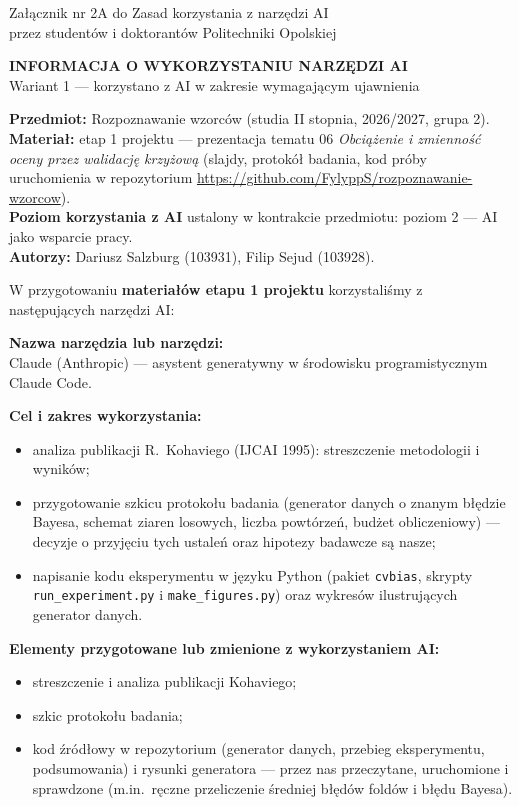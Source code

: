 \documentclass[11pt,a4paper]{article}
\begin{document}
\begin{flushright}\small
Załącznik nr 2A do Zasad korzystania z narzędzi AI\\
przez studentów i doktorantów Politechniki Opolskiej
\end{flushright}

\begin{center}
{\large\bfseries INFORMACJA O WYKORZYSTANIU NARZĘDZI AI}\\[0.4em]
Wariant 1 --- korzystano z AI w zakresie wymagającym ujawnienia
\end{center}

\textbf{Przedmiot:} Rozpoznawanie wzorców (studia II stopnia, 2026/2027, grupa 2).\\
\textbf{Materiał:} etap 1 projektu --- prezentacja tematu 06 \emph{Obciążenie i zmienność oceny przez
walidację krzyżową} (slajdy, protokół badania, kod próby uruchomienia w repozytorium
\url{https://github.com/FylyppS/rozpoznawanie-wzorcow}).\\
\textbf{Poziom korzystania z AI} ustalony w kontrakcie przedmiotu: poziom 2 --- AI jako wsparcie pracy.\\
\textbf{Autorzy:} Dariusz Salzburg (103931), Filip Sejud (103928).

\medskip
W przygotowaniu \textbf{materiałów etapu 1 projektu}
korzystaliśmy z następujących narzędzi AI:

\textbf{Nazwa narzędzia lub narzędzi:}\\
Claude (Anthropic) --- asystent generatywny w środowisku programistycznym Claude Code.

\textbf{Cel i zakres wykorzystania:}
\begin{itemize}
  \item analiza publikacji R.~Kohaviego (IJCAI 1995): streszczenie metodologii i wyników;
  \item przygotowanie szkicu protokołu badania (generator danych o znanym błędzie Bayesa, schemat
    ziaren losowych, liczba powtórzeń, budżet obliczeniowy) --- decyzje o przyjęciu tych ustaleń
    oraz hipotezy badawcze są nasze;
  \item napisanie kodu eksperymentu w języku Python (pakiet \texttt{cvbias}, skrypty
    \texttt{run\_experiment.py} i \texttt{make\_figures.py}) oraz wykresów ilustrujących generator danych.
\end{itemize}

\textbf{Elementy przygotowane lub zmienione z wykorzystaniem AI:}
\begin{itemize}
  \item streszczenie i analiza publikacji Kohaviego;
  \item szkic protokołu badania;
  \item kod źródłowy w repozytorium (generator danych, przebieg eksperymentu, podsumowania) i rysunki
    generatora --- przez nas przeczytane, uruchomione i sprawdzone (m.in.\ ręczne przeliczenie średniej
    błędów foldów i błędu Bayesa).
\end{itemize}
\end{document}
